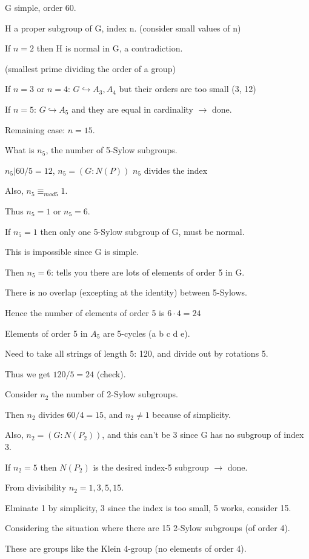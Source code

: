 \documentclass[12pt]{article}
\begin{document}
\noindent
G simple, order 60.

H a proper subgroup of G, index n.  (consider small values of n)

If $n = 2$ then H is normal in G, a contradiction.

(smallest prime dividing the order of a group)

If $n = 3$ or $n = 4$: $G \hookrightarrow A_3, A_4$ but their orders are too small (3, 12)

If $n = 5$: $G \hookrightarrow A_5$ and they are equal in cardinality $\to$ done.

Remaining case: $n = 15$.

What is $n_5$, the number of 5-Sylow subgroups.

$n_5 | 60\slash 5 = 12$, $n_5 = (G : N(P))$ $n_5$ divides the index

Also, $n_5 \equiv_{mod 5} 1$.

Thus $n_5 = 1$ or $n_5 = 6$.

If $n_5 = 1$ then only one 5-Sylow subgroup of G, must be normal.

This is impossible since G is simple.

Then $n_5 = 6$: tells you there are lots of elements of order 5 in G.

There is no overlap (excepting at the identity) between 5-Sylows.

Hence the number of elements of order 5 is $6 \cdot 4 = 24$

Elements of order 5 in $A_5$ are 5-cycles (a b c d e).

Need to take all strings of length 5: 120, and divide out by rotations 5.

Thus we get $120 \slash 5 = 24$ (check).

Consider $n_2$ the number of 2-Sylow subgroups.

Then $n_2$ divides $60/4 = 15$, and $n_2 \neq 1$ because of simplicity.

Also, $n_2 = (G : N(P_2))$, and this can't be 3 since G has no subgroup of index 3.

If $n_2 = 5$ then $N(P_2)$ is the desired index-5 subgroup $\to$ done.

From divisibility $n_2 = 1, 3, 5, 15$.

Elminate 1 by simplicity, 3 since the index is too small, 5 works, consider 15.

\noindent
Considering the situation where there are 15 2-Sylow subgroups (of order 4).

These are groups like the Klein 4-group (no elements of order 4).
\end{document}
